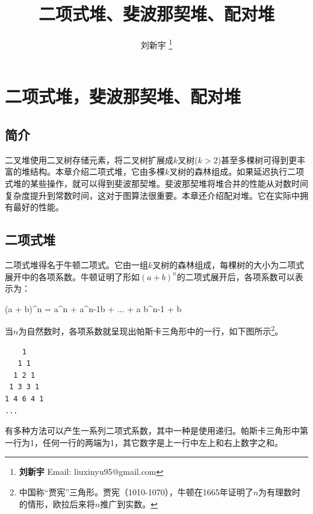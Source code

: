 \documentclass[b5paper]{ctexart}
\begin{document}
\title{二项式堆、斐波那契堆、配对堆}

\author{刘新宇
\thanks{{\bfseries 刘新宇 } \newline
  Email: liuxinyu95@gmail.com \newline}
  }

\maketitle
\fi


\ifx\wholebook\relax
\chapter{二项式堆，斐波那契堆、配对堆}
\fi

\section{简介}
\label{introduction}

二叉堆使用二叉树存储元素，将二叉树扩展成$k$叉树\cite{K-ary-tree}($k>2$)甚至多棵树可得到更丰富的堆结构。本章介绍二项式堆，它由多棵$k$叉树的森林组成。如果延迟执行二项式堆的某些操作，就可以得到斐波那契堆。斐波那契堆将堆合并的性能从对数时间复杂度提升到常数时间，这对于图算法很重要。本章还介绍配对堆。它在实际中拥有最好的性能。

\section{二项式堆}
\label{sec:binomial-heap} 

二项式堆得名于牛顿二项式。它由一组$k$叉树的森林组成，每棵树的大小为二项式展开中的各项系数。牛顿证明了形如$(a + b)^n$的二项式展开后，各项系数可以表示为：

\be
(a + b)^n = a^n +  a^{n-1}b + ... +  a b^{n-1} + b
\ee

当$n$为自然数时，各项系数就呈现出帕斯卡三角形中的一行，如下图所示\footnote{中国称“贾宪”三角形。贾宪（1010-1070），牛顿在1665年证明了$n$为有理数时的情形，欧拉后来将$n$推广到实数。}\cite{wiki-pascal-triangle}。

\begin{verbatim}
    1
   1 1
  1 2 1
 1 3 3 1
1 4 6 4 1
...
\end{verbatim}

有多种方法可以产生一系列二项式系数，其中一种是使用递归。帕斯卡三角形中第一行为1，任何一行的两端为1，其它数字是上一行中左上和右上数字之和。
\end{document}
